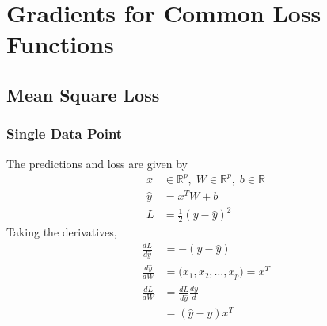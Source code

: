 \documentclass[../../deep_learning_notes.tex]{subfiles}
\begin{document}
\section{Gradients for Common Loss Functions}
\subsection{Mean Square Loss}
\subsubsection*{Single Data Point}
The predictions and loss are given by
\begin{align*}
    x &\in \mathbb{R}^{p}, \; W \in \mathbb{R}^{p}, \; b \in \mathbb{R}\\
    \hat{y} &= x^{T}W + b\\
    L &= \frac{1}{2}(y - \hat{y})^{2}
\end{align*}
Taking the derivatives,
\begin{align*}
    \frac{dL}{d\hat{y}} &= -(y - \hat{y})\\
    \frac{d\hat{y}}{dW} &= \big( x_{1}, x_{2}, \ldots, x_{p} \big) = x^{T}\\
    \frac{dL}{dW} &= \frac{dL}{d\hat{y}} \frac{d\hat{y}}{d}\\
    &= (\hat{y} - y) x^{T}
\end{align*}


\end{document}
